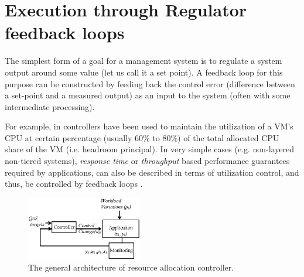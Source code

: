 

% 


\section{Execution through Regulator feedback loops}
\label{sec:regulators}
The simplest form of a goal for a management system is to regulate a system output around some value (let us call it a set point).  
A feedback loop for this purpose can be constructed by feeding back the control error (difference between a set-point and a measured output) as an input to the system (often with some intermediate processing). 

For example, in \cite{kalyvianaki_self-adaptive_2009,abdelzaher_performance_2002} controllers have been used to maintain the utilization of a VM's CPU at certain percentage (usually 60\% to 80\%) of the total allocated CPU share of the VM (i.e. headroom principal). 
In very simple cases (e.g. non-layered non-tiered systems), \textit{response time} or \textit{throughput} based performance guarantees required by applications, can also be described in terms of utilization control, and thus, be controlled by feedback loops \cite{abdelzaher_performance_2002,abdelzaher_modeling_2000,lu_feedback_2003,abdelzaher_feedback_2003}. 

\begin{figure}[t]
	\centering
	\includegraphics[width=0.45\textwidth]{image/loop/control-loop-general.eps}
	\caption{The general architecture of resource allocation controller.}
	\label{fig:control-loop-general}
\end{figure}

